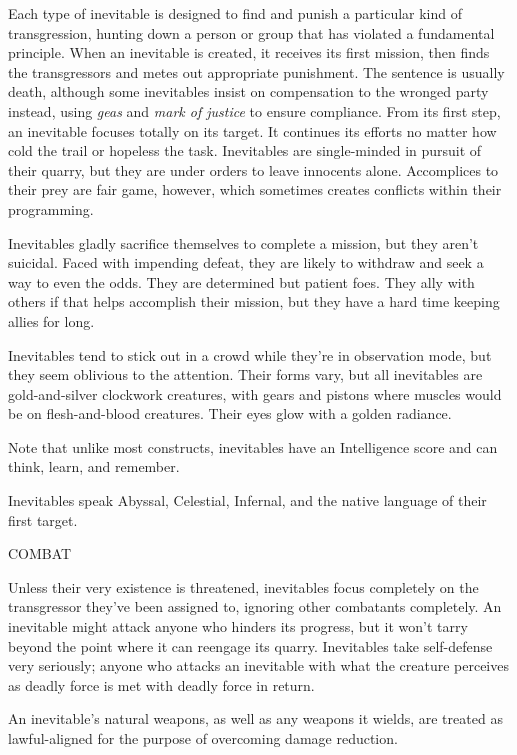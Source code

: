 \documentclass{article}
\begin{document}
Each type of inevitable is designed to find and punish a particular kind of transgression, 
hunting down a person or group that has violated a fundamental principle. When 
an inevitable is created, it receives its first mission, then finds the transgressors 
and metes out appropriate punishment. The sentence is usually death, although some 
inevitables insist on compensation to the wronged party instead, using \textit{geas 
}and \textit{mark of justice }to ensure compliance. From its first step, an inevitable 
focuses totally on its target. It continues its efforts no matter how cold the 
trail or hopeless the task. Inevitables are single-minded in pursuit of their quarry, 
but they are under orders to leave innocents alone. Accomplices to their prey are 
fair game, however, which sometimes creates conflicts within their programming. 

Inevitables gladly sacrifice themselves to complete a mission, but they aren't 
suicidal. Faced with impending defeat, they are likely to withdraw and seek a way 
to even the odds. They are determined but patient foes. They ally with others if 
that helps accomplish their mission, but they have a hard time keeping allies for 
long.

Inevitables tend to stick out in a crowd while they're in observation mode, but 
they seem oblivious to the attention. Their forms vary, but all inevitables are 
gold-and-silver clockwork creatures, with gears and pistons where muscles would 
be on flesh-and-blood creatures. Their eyes glow with a golden radiance.

Note that unlike most constructs, inevitables have an Intelligence score and can 
think, learn, and remember.

Inevitables speak Abyssal, Celestial, Infernal, and the native language of their 
first target.

COMBAT

Unless their very existence is threatened, inevitables focus completely on the 
transgressor they've been assigned to, ignoring other combatants completely. An 
inevitable might attack anyone who hinders its progress, but it won't tarry beyond 
the point where it can reengage its quarry. Inevitables take self-defense very 
seriously; anyone who attacks an inevitable with what the creature perceives as 
deadly force is met with deadly force in return.

An inevitable's natural weapons, as well as any weapons it wields, are treated 
as lawful-aligned for the purpose of overcoming damage reduction.
\end{document}

